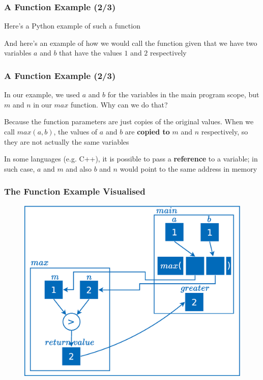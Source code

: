 \documentclass{beamer}
\begin{document}
\begin{frame}
\frametitle{A Function Example (2/3)}
    Here's a Python example of such a function
    
    \vspace{0.5cm}

    And here's an example of how we would call the function given that we have two variables $a$ and $b$ that have the values $1$ and $2$ respectively
    
\end{frame}

\begin{frame}
\frametitle{A Function Example (2/3)}
    In our example, we used $a$ and $b$ for the variables in the main program scope, but $m$ and $n$ in our $max$ function. Why can we do that?
    \newline

    Because the function parameters are just copies of the original values. When we call $max(a,b)$, the values of $a$ and $b$ are \textbf{copied to} $m$ and $n$ respectively, so they are not actually the same variables
    \newline

    In some languages (e.g. C++), it is possible to pass a \textbf{reference} to a variable; in such case, $a$ and $m$ and also $b$ and $n$ would point to the same address in memory
\end{frame}

\begin{frame}
\frametitle{The Function Example Visualised}
    \begin{figure}[H]
        \centering
        \includegraphics[scale=0.25]{figures/max_function_example.eps}
    \end{figure}
\end{frame}
\end{document}
